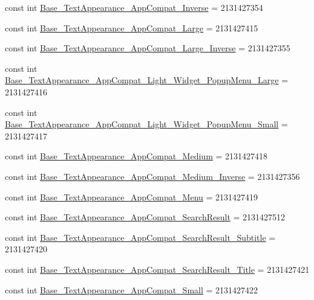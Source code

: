 \begin{CompactItemize}
\item 
const int \hyperlink{class__2doo_1_1_droid_1_1_resource_1_1_style_fef5008db0ecf476e36a4a3fb31a5868}{Base\_\-TextAppearance\_\-AppCompat\_\-Inverse} = 2131427354
\item 
const int \hyperlink{class__2doo_1_1_droid_1_1_resource_1_1_style_2bd263b447b0faa446d5c7af213fb670}{Base\_\-TextAppearance\_\-AppCompat\_\-Large} = 2131427415
\item 
const int \hyperlink{class__2doo_1_1_droid_1_1_resource_1_1_style_38e48f7d18b39a2ec44f404df7636b73}{Base\_\-TextAppearance\_\-AppCompat\_\-Large\_\-Inverse} = 2131427355
\item 
const int \hyperlink{class__2doo_1_1_droid_1_1_resource_1_1_style_89c3be72e56834e73c306c655011de94}{Base\_\-TextAppearance\_\-AppCompat\_\-Light\_\-Widget\_\-PopupMenu\_\-Large} = 2131427416
\item 
const int \hyperlink{class__2doo_1_1_droid_1_1_resource_1_1_style_3be59c6c69b61043a587a7663aaf74df}{Base\_\-TextAppearance\_\-AppCompat\_\-Light\_\-Widget\_\-PopupMenu\_\-Small} = 2131427417
\item 
const int \hyperlink{class__2doo_1_1_droid_1_1_resource_1_1_style_a81d99ee68383f35655815e269e6059f}{Base\_\-TextAppearance\_\-AppCompat\_\-Medium} = 2131427418
\item 
const int \hyperlink{class__2doo_1_1_droid_1_1_resource_1_1_style_5cfa5619027268f229178d9f4e6a9ae7}{Base\_\-TextAppearance\_\-AppCompat\_\-Medium\_\-Inverse} = 2131427356
\item 
const int \hyperlink{class__2doo_1_1_droid_1_1_resource_1_1_style_5414a75d23c8625ca31ad78439825727}{Base\_\-TextAppearance\_\-AppCompat\_\-Menu} = 2131427419
\item 
const int \hyperlink{class__2doo_1_1_droid_1_1_resource_1_1_style_80100b1dd2c85f0d66729a0eed6d5c97}{Base\_\-TextAppearance\_\-AppCompat\_\-SearchResult} = 2131427512
\item 
const int \hyperlink{class__2doo_1_1_droid_1_1_resource_1_1_style_e797263b14f8779d1c6b9f1abf840cdd}{Base\_\-TextAppearance\_\-AppCompat\_\-SearchResult\_\-Subtitle} = 2131427420
\item 
const int \hyperlink{class__2doo_1_1_droid_1_1_resource_1_1_style_d25fad0b423b38b85730405019bb94f1}{Base\_\-TextAppearance\_\-AppCompat\_\-SearchResult\_\-Title} = 2131427421
\item 
const int \hyperlink{class__2doo_1_1_droid_1_1_resource_1_1_style_4890e5b6c87f22598938933a3efd48f7}{Base\_\-TextAppearance\_\-AppCompat\_\-Small} = 2131427422

\end{CompactItemize}
